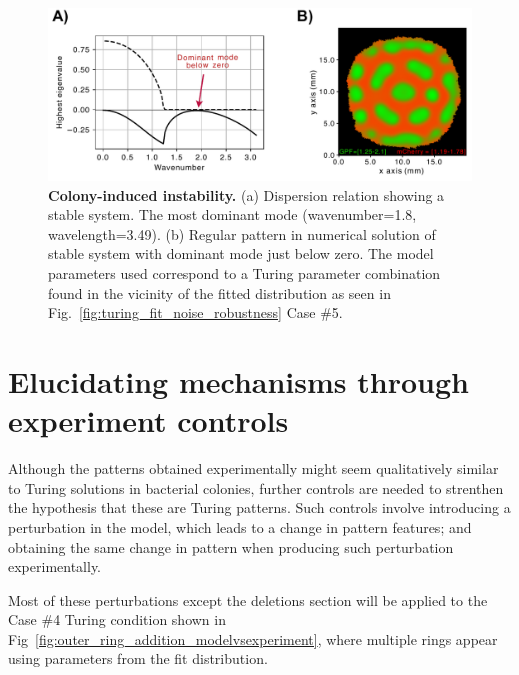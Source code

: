 \begin{figure}[H] %
    \centering
    \begin{adjustbox}{center}
        \includegraphics[width=1\textwidth]{chapters/Chapter 3/colony_induced_turing} %
    \end{adjustbox}
    \caption{\textbf{Colony-induced instability.}  (a) Dispersion relation showing a stable system. The most dominant mode (wavenumber=1.8, wavelength=3.49). (b) Regular pattern in numerical solution of stable system with dominant mode just below zero. The model parameters used correspond to a Turing parameter combination found in the vicinity of the fitted distribution as seen in Fig.~\ref{fig:turing_fit_noise_robustness} Case \#5.}
    \label{fig:colony_induced_turing}
\end{figure}


\section{Elucidating mechanisms through experiment controls}
Although the patterns obtained experimentally might seem qualitatively similar to Turing solutions in bacterial colonies, further controls are needed to strenthen the hypothesis that these are Turing patterns.
Such controls involve introducing a perturbation in the model, which leads to a change in pattern features; and obtaining the same change in pattern when producing such perturbation experimentally.

Most of these perturbations except the deletions section will be applied to the Case \#4 Turing condition shown in Fig~\ref{fig:outer_ring_addition_modelvsexperiment}, where multiple rings appear using parameters from the fit distribution.

